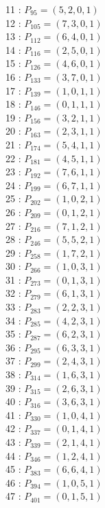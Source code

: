 \documentclass{article}
\begin{document}
{\begin{multicols}{3}
11 : $P_{95}=( 5, 2, 0, 1 )$\\
12 : $P_{105}=( 7, 3, 0, 1 )$\\
13 : $P_{112}=( 6, 4, 0, 1 )$\\
14 : $P_{116}=( 2, 5, 0, 1 )$\\
15 : $P_{126}=( 4, 6, 0, 1 )$\\
16 : $P_{133}=( 3, 7, 0, 1 )$\\
17 : $P_{139}=( 1, 0, 1, 1 )$\\
18 : $P_{146}=( 0, 1, 1, 1 )$\\
19 : $P_{156}=( 3, 2, 1, 1 )$\\
20 : $P_{163}=( 2, 3, 1, 1 )$\\
21 : $P_{174}=( 5, 4, 1, 1 )$\\
22 : $P_{181}=( 4, 5, 1, 1 )$\\
23 : $P_{192}=( 7, 6, 1, 1 )$\\
24 : $P_{199}=( 6, 7, 1, 1 )$\\
25 : $P_{202}=( 1, 0, 2, 1 )$\\
26 : $P_{209}=( 0, 1, 2, 1 )$\\
27 : $P_{216}=( 7, 1, 2, 1 )$\\
28 : $P_{246}=( 5, 5, 2, 1 )$\\
29 : $P_{258}=( 1, 7, 2, 1 )$\\
30 : $P_{266}=( 1, 0, 3, 1 )$\\
31 : $P_{273}=( 0, 1, 3, 1 )$\\
32 : $P_{279}=( 6, 1, 3, 1 )$\\
33 : $P_{283}=( 2, 2, 3, 1 )$\\
34 : $P_{285}=( 4, 2, 3, 1 )$\\
35 : $P_{287}=( 6, 2, 3, 1 )$\\
36 : $P_{295}=( 6, 3, 3, 1 )$\\
37 : $P_{299}=( 2, 4, 3, 1 )$\\
38 : $P_{314}=( 1, 6, 3, 1 )$\\
39 : $P_{315}=( 2, 6, 3, 1 )$\\
40 : $P_{316}=( 3, 6, 3, 1 )$\\
41 : $P_{330}=( 1, 0, 4, 1 )$\\
42 : $P_{337}=( 0, 1, 4, 1 )$\\
43 : $P_{339}=( 2, 1, 4, 1 )$\\
44 : $P_{346}=( 1, 2, 4, 1 )$\\
45 : $P_{383}=( 6, 6, 4, 1 )$\\
46 : $P_{394}=( 1, 0, 5, 1 )$\\
47 : $P_{401}=( 0, 1, 5, 1 )$\\

\end{multicols}}
\end{document}
